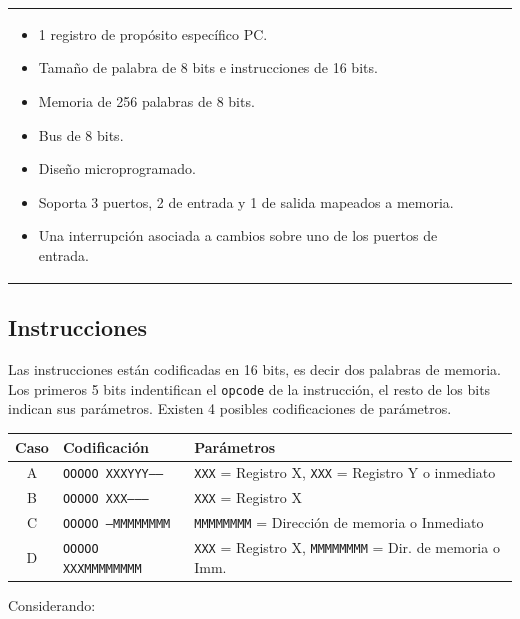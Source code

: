 \documentclass[a4paper,11pt]{article}
\begin{document}
\begin{center}
\begin{tabular}[c]{p{6.5cm}p{8cm}}
\begin{minipage}{8cm}
\begin{itemize}
 \item 1 registro de propósito específico PC.
 \item Tamaño de palabra de 8 bits e instrucciones de 16 bits.
 \item Memoria de 256 palabras de 8 bits.
 \item Bus de 8 bits.
 \item Diseño microprogramado.
 \item Soporta 3 puertos, 2 de entrada y 1 de salida mapeados a memoria.
 \item Una interrupción asociada a cambios sobre uno de los puertos de entrada.
\end{itemize}
\end{minipage}
\\
\end{tabular}
\end{center}

\subsection*{Instrucciones}

Las instrucciones están codificadas en 16 bits, es decir dos palabras de memoria.
Los primeros 5 bits indentifican el \texttt{opcode} de la instrucción, el resto de los bits indican sus parámetros.
Existen 4 posibles codificaciones de parámetros.

\begin{center}
\begin{tabular}{c|l|l}
Caso & Codificación               & Parámetros \\
\hline
A    & \texttt{OOOOO XXXYYY-----} & \texttt{XXX} = Registro X, \texttt{XXX} = Registro Y o inmediato \\
B    & \texttt{OOOOO XXX--------} & \texttt{XXX} = Registro X\\
C    & \texttt{OOOOO ---MMMMMMMM} & \texttt{MMMMMMMM} = Dirección de memoria o Inmediato\\
D    & \texttt{OOOOO XXXMMMMMMMM} & \texttt{XXX} = Registro X, \texttt{MMMMMMMM} = Dir. de memoria o Imm.\\
\end{tabular}
\end{center}

\noindent Considerando:
\end{document}
